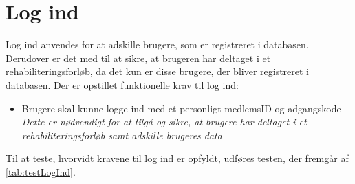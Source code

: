 \section{Log ind}
Log ind anvendes for at adskille brugere, som er registreret i databasen. Derudover er det med til at sikre, at brugeren har deltaget i et rehabiliteringsforløb, da det kun er disse brugere, der bliver registreret i databasen. Der er opstillet funktionelle krav til log ind:

\begin{itemize}
\item Brugere skal kunne logge ind med et personligt medlemsID og adgangskode
\\
\textit{Dette er nødvendigt for at tilgå og sikre, at brugere har deltaget i et rehabiliteringsforløb samt adskille brugeres data}
\end{itemize}

\noindent
Til at teste, hvorvidt kravene til log ind er opfyldt, udføres testen, der fremgår af \autoref{tab:testLogInd}.

